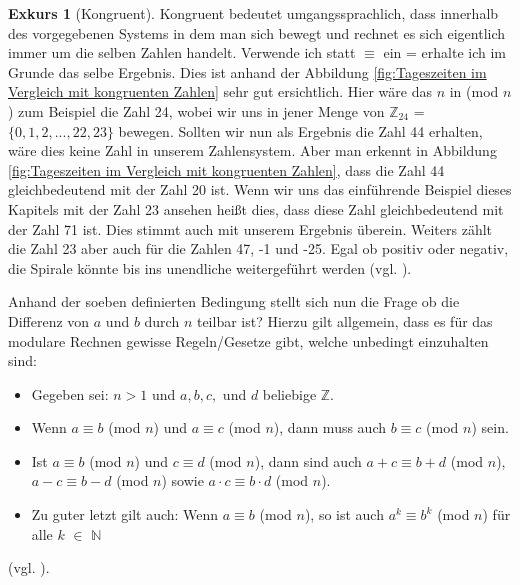 \documentclass[12pt,a4paper]{article}
\theoremstyle{definition}
\newtheorem{exkurs}{Exkurs}
\begin{document}
\newpage
\begin{exkurs}[Kongruent]
Kongruent bedeutet umgangssprachlich, dass innerhalb des vorgegebenen Systems in dem man sich bewegt und rechnet es sich eigentlich immer um die selben Zahlen handelt.
Verwende ich statt $\equiv$ ein = erhalte ich im Grunde das selbe Ergebnis.
Dies ist anhand der Abbildung \ref{fig:Tageszeiten im Vergleich mit kongruenten Zahlen} sehr gut ersichtlich.
Hier wäre das $n$ in (mod $n$) zum Beispiel die Zahl 24, wobei wir uns in jener Menge von $\mathbb{Z}_{24}$ = $\{0, 1, 2, ..., 22, 23\}$ bewegen.
Sollten wir nun als Ergebnis die Zahl 44 erhalten, wäre dies keine Zahl in unserem Zahlensystem.
Aber man erkennt in Abbildung \ref{fig:Tageszeiten im Vergleich mit kongruenten Zahlen}, dass die Zahl 44 gleichbedeutend mit der Zahl 20 ist.
Wenn wir uns das einführende Beispiel dieses Kapitels mit der Zahl 23 ansehen heißt dies, dass diese Zahl gleichbedeutend mit der Zahl 71 ist.
Dies stimmt auch mit unserem Ergebnis überein.
Weiters zählt die Zahl 23 aber auch für die Zahlen 47, -1 und -25.
Egal ob positiv oder negativ, die Spirale könnte bis ins unendliche weitergeführt werden (vgl. \cite[298--299]{Meinel2011}).
\end{exkurs}

Anhand der soeben definierten Bedingung stellt sich nun die Frage ob die Differenz von $a$ und $b$ durch $n$ teilbar ist?
Hierzu gilt allgemein, dass es für das modulare Rechnen gewisse Regeln/Gesetze gibt, welche unbedingt einzuhalten sind:
\begin{itemize}
    \item Gegeben sei: $n>1$ und $a, b, c,$ und $d$ beliebige $\mathbb{Z}$.
    \item Wenn $a\equiv b$ (mod $n$) und $a\equiv c$ (mod $n$), dann muss auch $b\equiv c$ (mod $n$) sein.
    \item Ist $a\equiv b$ (mod $n$) und $c\equiv d$ (mod $n$), dann sind auch $a + c\equiv b + d$ (mod $n$), $a - c\equiv b - d$ (mod $n$) sowie $a \cdot c\equiv b \cdot d$ (mod $n$).
    \item Zu guter letzt gilt auch: Wenn $a\equiv b$ (mod $n$), so ist auch $a^k\equiv b^k$ (mod $n$) für alle $k$ $\in$ $\mathbb{N}$
\end{itemize}
(vgl. \cite[66]{RempeGillen2009}).
\end{document}
